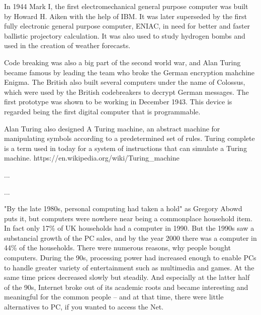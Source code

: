 \documentclass[a4paper,12pt]{article}
\begin{document}
In 1944 Mark I, the first electromechanical general purpose computer was built by Howard H. Aiken with the help of IBM. It was later superseded by the first fully electronic general purpose computer, ENIAC, in need for better and faster ballistic projectory calculation. It was also used to study hydrogen bombs and used in the creation of weather forecasts.

Code breaking was also a big part of the second world war, and Alan Turing became famous by leading the team who broke the German encryption mahchine Enigma. The British also built several computers under the name of Colossus, which were used by the British codebreakers to decrypt German messages. The first prototype was shown to be working in December 1943. This device is regarded being the first digital computer that is programmable.

Alan Turing also designed A Turing machine, an abstract machine for manipulating symbols according to a predetermined set of rules. Turing complete is a term used in today for a system of instructions that can simulate a Turing machine. https://en.wikipedia.org/wiki/Turing\_machine

...



...

"By the late 1980s, personal computing had taken a hold" as Gregory Abowd puts it\cite{gda}, but computers were nowhere near being a commonplace household item. In fact only 17\% of UK households had a computer in 1990\cite{stat}. But the 1990s saw a substancial growth of the PC sales, and by the year 2000 there was a computer in 44\% of the households\cite{stat}. There were numerous reasons, why people bought computers. During the 90s, processing power had increased enough to enable PCs to handle greater variety of entertainment such as multimedia and games. At the same time prices decreased slowly but steadily. And especially at the latter half of the 90s, Internet broke out of its academic roots and became interesting and meaningful for the common people -- and at that time, there were little alternatives to PC, if you wanted to access the Net.


\newpage
\end{document}
